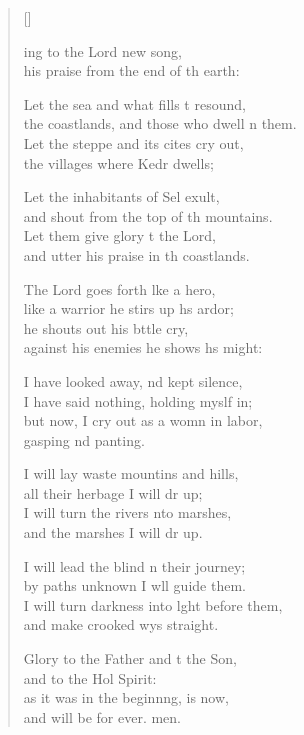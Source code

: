 \settowidth{\versewidth}{I will turn darkness into light before them, *}
\begin{verse}[\versewidth]
  \begin{patverse}
ing to the Lord  new song,\Med\\
his praise from the end of th earth:

Let the sea and what fills \pointup{\i}t resound,\Med\\
the coastlands, and those who dwell \pointup{\i}n them.\\
Let the steppe and its cit\pointup{\i}es cry out,\Med\\
the villages where Kedr dwells;

Let the inhabitants of Sel exult,\Med\\
and shout from the top of th mountains.\\
Let them give glory t the Lord,\Med\\
and utter his praise in th coastlands.

The Lord goes forth l\pointup{\i}ke a hero,\Med\\
like a warrior he stirs up h\pointup{\i}s ardor;\\
he shouts out his bttle cry,\Med\\
against his enemies he shows h\pointup{\i}s might:

I have looked away, nd kept silence,\Med\\
I have said nothing, holding myslf in;\\
but now, I cry out as a womn in labor,\Med\\
gasping nd panting.

I will lay waste mountins and hills,\Med\\
all their herbage I will dr up;\\
I will turn the rivers \pointup{\i}nto marshes,\Med\\
and the marshes I will dr up.

I will lead the blind n their journey;\Med\\
by paths unknown I w\pointup{\i}ll guide them.\\
I will turn darkness into l\pointup{\i}ght before them,\Med\\
and make crooked wys straight.

Glory to the Father and t the Son,\Med\\
    and to the Hol Spirit:\\
as it was in the beginn\pointup{\i}ng, is now,\Med\\
    and will be for ever. men.
  \end{patverse}
\end{verse}
